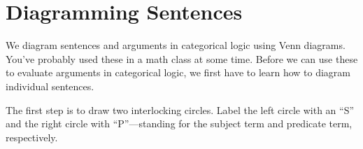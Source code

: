 \medskip
{}

\section{Diagramming Sentences}
\label{sec:diagramming-sentences}



We diagram sentences and arguments in categorical logic using Venn diagrams. You've probably used these in a math class at some time. Before we can use these to evaluate arguments in categorical logic, we first have to learn how to diagram individual sentences.

The first step is to draw two interlocking circles. Label the left circle with an \enquote{S} and the right circle with \enquote{P}---standing for the subject term and predicate term, respectively.

\def\sub{(0,0) circle (1.5cm)}
\def\mid{(-60:2cm) circle (1.5cm)}
\def\pred{(0:2cm) circle (1.5cm)}

